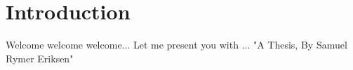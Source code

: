 \chapter{Introduction}
\par
Welcome welcome welcome...
Let me present you with ... "A Thesis, By Samuel Rymer Eriksen"